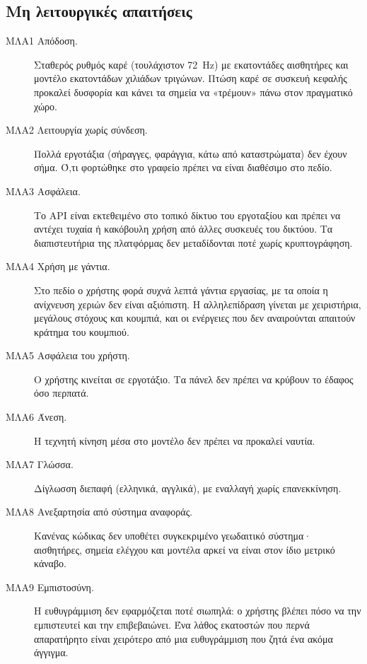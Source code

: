 \subsection{Μη λειτουργικές απαιτήσεις}

\begin{description}
  \item[ΜΛΑ1 Απόδοση.] Σταθερός ρυθμός καρέ (τουλάχιστον \SI{72}{Hz}) με εκατοντάδες αισθητήρες και μοντέλο εκατοντάδων χιλιάδων τριγώνων. Πτώση καρέ σε συσκευή κεφαλής προκαλεί δυσφορία και κάνει τα σημεία να «τρέμουν» πάνω στον πραγματικό χώρο.
  \item[ΜΛΑ2 Λειτουργία χωρίς σύνδεση.] Πολλά εργοτάξια (σήραγγες, φαράγγια, κάτω από καταστρώματα) δεν έχουν σήμα. Ό,τι φορτώθηκε στο γραφείο πρέπει να είναι διαθέσιμο στο πεδίο.
  \item[ΜΛΑ3 Ασφάλεια.] Το API είναι εκτεθειμένο στο τοπικό δίκτυο του εργοταξίου και πρέπει να αντέχει τυχαία ή κακόβουλη χρήση από άλλες συσκευές του δικτύου. Τα διαπιστευτήρια της πλατφόρμας δεν μεταδίδονται ποτέ χωρίς κρυπτογράφηση.
  \item[ΜΛΑ4 Χρήση με γάντια.] Στο πεδίο ο χρήστης φορά συχνά λεπτά γάντια εργασίας, με τα οποία η ανίχνευση χεριών δεν είναι αξιόπιστη. Η αλληλεπίδραση γίνεται με χειριστήρια, μεγάλους στόχους και κουμπιά, και οι ενέργειες που δεν αναιρούνται απαιτούν κράτημα του κουμπιού.
  \item[ΜΛΑ5 Ασφάλεια του χρήστη.] Ο χρήστης κινείται σε εργοτάξιο. Τα πάνελ δεν πρέπει να κρύβουν το έδαφος όσο περπατά.
  \item[ΜΛΑ6 Άνεση.] Η τεχνητή κίνηση μέσα στο μοντέλο δεν πρέπει να προκαλεί ναυτία.
  \item[ΜΛΑ7 Γλώσσα.] Δίγλωσση διεπαφή (ελληνικά, αγγλικά), με εναλλαγή χωρίς επανεκκίνηση.
  \item[ΜΛΑ8 Ανεξαρτησία από σύστημα αναφοράς.] Κανένας κώδικας δεν υποθέτει συγκεκριμένο γεωδαιτικό σύστημα· αισθητήρες, σημεία ελέγχου και μοντέλα αρκεί να είναι στον ίδιο μετρικό κάναβο.
  \item[ΜΛΑ9 Εμπιστοσύνη.] Η ευθυγράμμιση δεν εφαρμόζεται ποτέ σιωπηλά: ο χρήστης βλέπει πόσο να την εμπιστευτεί και την επιβεβαιώνει. Ένα λάθος εκατοστών που περνά απαρατήρητο είναι χειρότερο από μια ευθυγράμμιση που ζητά ένα ακόμα άγγιγμα.
\end{description}


